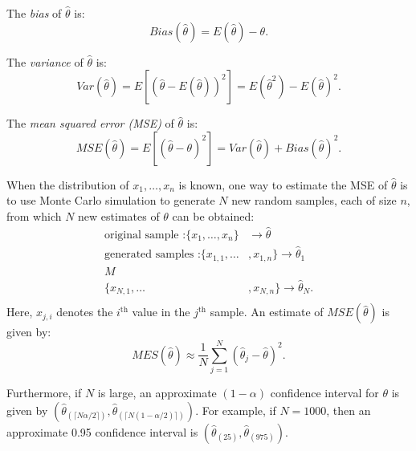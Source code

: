\begin{asparaenum}[(a)]
\item The {\it bias} of $\hat{\theta}$ is:
\begin{equation}
Bias(\hat{\theta})=E(\hat{\theta})-\theta.
\end{equation}

\item The {\it variance} of $\hat{\theta}$ is:
\begin{equation}
Var(\hat{\theta})=E[(\hat{\theta}-E(\hat{\theta}))^2]=E(\hat{\theta}^2)-E(\hat{\theta})^2.
\end{equation}


\item The {\it mean squared error (MSE)} of $\hat{\theta}$ is:
\begin{equation}
MSE(\hat{\theta})=E[(\hat{\theta}-\theta)^2]=Var(\hat{\theta})+Bias(\hat{\theta})^2.
\end{equation}
\end{asparaenum}
When the distribution of $x_1,\ldots,x_n$ is known, one way to estimate the MSE of $\hat{\theta}$ is to use Monte Carlo simulation to generate $N$ new random samples, each of size $n$, from which $N$ new estimates of $\theta$ can be obtained:
\begin{displaymath}
\begin{split}
\textrm{original sample :}\{x_1,\ldots,x_n\}&\rightarrow\hat{\theta}\\
\textrm{generated samples :}\{x_{1,1},\ldots&,x_{1,n}\}\rightarrow\hat{\theta}_1\\
M&\\
\{x_{N,1},\ldots&,x_{N,n}\}\rightarrow\hat{\theta}_N.\\
\end{split}
\end{displaymath}
Here, $x_{j,i}$ denotes the $i^{\textrm{th}}$ value in the $j^{\textrm{th}}$ sample. An estimate of $MSE(\hat{\theta})$ is given by:
\begin{equation}
MES(\hat{\theta})\approx\frac{1}{N}\sum^N_{j=1}(\hat{\theta}_j-\hat{\theta})^2.
\end{equation}

Furthermore, if $N$ is large, an approximate $(1-\alpha)$ confidence interval for $\theta$ is given by $(\hat{\theta}_{(\lceil N\alpha/2\rceil)},\hat{\theta}_{(\lceil N(1-\alpha/2)\rceil)})$. For example, if $N = 1000$, then an approximate 0.95 confidence interval is $(\hat{\theta}_{(25)},\hat{\theta}_{(975)})$.

